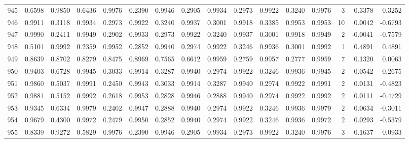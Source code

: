 \begin{tabular}{lrrrrrrrrrrrrrrr}
945 &      0.6598 &  0.9850 &  0.6436 &  0.9976 &  0.2390 &  0.9946 &  0.2905 &  0.9934 &  0.2973 &  0.9922 &   0.3240 &     0.9976 &      3 &                    0.3378 &                     0.3252 \\
946 &      0.9911 &  0.3118 &  0.9934 &  0.2973 &  0.9922 &  0.3240 &  0.9937 &  0.3001 &  0.9918 &  0.3385 &   0.9953 &     0.9953 &     10 &                    0.0042 &                    -0.6793 \\
947 &      0.9990 &  0.2411 &  0.9949 &  0.2902 &  0.9933 &  0.2973 &  0.9922 &  0.3240 &  0.9937 &  0.3001 &   0.9918 &     0.9949 &      2 &                   -0.0041 &                    -0.7579 \\
948 &      0.5101 &  0.9992 &  0.2359 &  0.9952 &  0.2852 &  0.9940 &  0.2974 &  0.9922 &  0.3246 &  0.9936 &   0.3001 &     0.9992 &      1 &                    0.4891 &                     0.4891 \\
949 &      0.8639 &  0.8702 &  0.8279 &  0.8475 &  0.8969 &  0.7565 &  0.6612 &  0.9959 &  0.2759 &  0.9957 &   0.2777 &     0.9959 &      7 &                    0.1320 &                     0.0063 \\
950 &      0.9403 &  0.6728 &  0.9945 &  0.3033 &  0.9914 &  0.3287 &  0.9940 &  0.2974 &  0.9922 &  0.3246 &   0.9936 &     0.9945 &      2 &                    0.0542 &                    -0.2675 \\
951 &      0.9860 &  0.5037 &  0.9991 &  0.2450 &  0.9943 &  0.3033 &  0.9914 &  0.3287 &  0.9940 &  0.2974 &   0.9922 &     0.9991 &      2 &                    0.0131 &                    -0.4823 \\
952 &      0.9881 &  0.5152 &  0.9992 &  0.2618 &  0.9953 &  0.2828 &  0.9946 &  0.2888 &  0.9940 &  0.2974 &   0.9922 &     0.9992 &      2 &                    0.0111 &                    -0.4729 \\
953 &      0.9345 &  0.6334 &  0.9979 &  0.2402 &  0.9947 &  0.2888 &  0.9940 &  0.2974 &  0.9922 &  0.3246 &   0.9936 &     0.9979 &      2 &                    0.0634 &                    -0.3011 \\
954 &      0.9679 &  0.4300 &  0.9972 &  0.2479 &  0.9950 &  0.2852 &  0.9940 &  0.2974 &  0.9922 &  0.3246 &   0.9936 &     0.9972 &      2 &                    0.0293 &                    -0.5379 \\
955 &      0.8339 &  0.9272 &  0.5829 &  0.9976 &  0.2390 &  0.9946 &  0.2905 &  0.9934 &  0.2973 &  0.9922 &   0.3240 &     0.9976 &      3 &                    0.1637 &                     0.0933 \\

\end{tabular}

